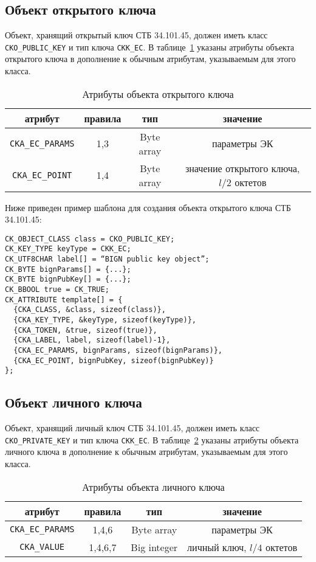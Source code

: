 \subsection{Объект открытого ключа}
Объект, хранящий открытый ключ СТБ 34.101.45, должен иметь
класс \verb|CKO_PUBLIC_KEY| и тип ключа \verb|CKK_EC|.
В таблице~\ref{Table.CRYPTOKI.EcPubkeyAttrs} указаны
атрибуты объекта открытого ключа в дополнение к обычным
атрибутам, указываемым для этого класса.

\begin{table}[H]
\caption{Атрибуты объекта открытого ключа}\label{Table.CRYPTOKI.EcPubkeyAttrs}
\begin{tabular}{|c|c|c|c|}
\hline
атрибут & правила & тип & значение\\
\hline
\hline
\verb|CKA_EC_PARAMS| & 1,3 & Byte array &
параметры ЭК\\
\hline
\verb|CKA_EC_POINT| & 1,4 & Byte array &
значение открытого ключа, $l/2$ октетов\\
\hline
\end{tabular}
\end{table}

Ниже приведен пример шаблона для создания объекта открытого ключа СТБ 34.101.45:
\begin{verbatim}
CK_OBJECT_CLASS class = CKO_PUBLIC_KEY;
CK_KEY_TYPE keyType = CKK_EC;
CK_UTF8CHAR label[] = “BIGN public key object”;
CK_BYTE bignParams[] = {...};
CK_BYTE bignPubKey[] = {...};
CK_BBOOL true = CK_TRUE;
CK_ATTRIBUTE template[] = {
  {CKA_CLASS, &class, sizeof(class)},
  {CKA_KEY_TYPE, &keyType, sizeof(keyType)},
  {CKA_TOKEN, &true, sizeof(true)},
  {CKA_LABEL, label, sizeof(label)-1},
  {CKA_EC_PARAMS, bignParams, sizeof(bignParams)},
  {CKA_EC_POINT, bignPubKey, sizeof(bignPubKey)}
};
\end{verbatim}

\subsection{Объект личного ключа}
Объект, хранящий личный ключ СТБ 34.101.45, должен иметь
класс \verb|CKO_PRIVATE_KEY| и тип ключа \verb|CKK_EC|.
В таблице~\ref{Table.CRYPTOKI.EcPrivkeyAttrs} указаны
атрибуты объекта личного ключа в дополнение к обычным
атрибутам, указываемым для этого класса.

\begin{table}[H]
\caption{Атрибуты объекта личного ключа}\label{Table.CRYPTOKI.EcPrivkeyAttrs}
\begin{tabular}{|c|c|c|c|}
\hline
атрибут & правила & тип & значение\\
\hline
\hline
\verb|CKA_EC_PARAMS| & 1,4,6 & Byte array &
параметры ЭК\\
\hline
\verb|CKA_VALUE| & 1,4,6,7 & Big integer &
личный ключ, $l/4$ октетов\\
\hline
\end{tabular}
\end{table}

